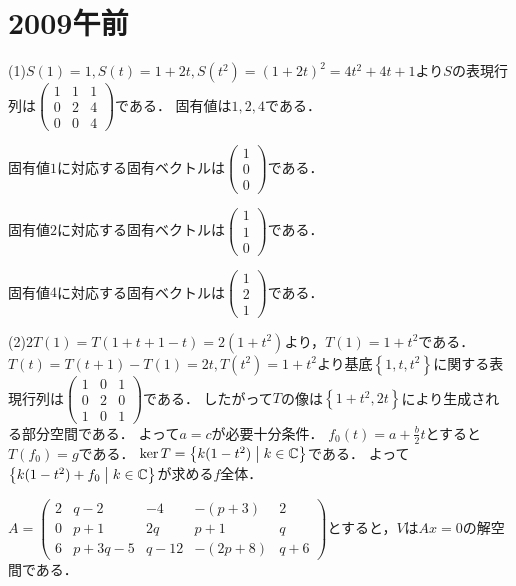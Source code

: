 \documentclass[
		book,
		head_space=20mm,
		foot_space=20mm,
		gutter=10mm,
		line_length=190mm
]{jlreq}
\begin{document}
\section{2009午前}
(1)$S(1)=1,S(t)=1+2t,S(t^2)=(1+2t)^2=4t^2+4t+1$より$S$の表現行列は$\begin{pmatrix}
1&1&1\\
0&2&4\\
0&0&4
\end{pmatrix}$である．
固有値は$1,2,4$である．

固有値$1$に対応する固有ベクトルは$\begin{pmatrix}
1\\0\\0
\end{pmatrix}$である．

固有値$2$に対応する固有ベクトルは$\begin{pmatrix}
1\\1\\0
\end{pmatrix}$である．

固有値$4$に対応する固有ベクトルは$\begin{pmatrix}
1\\2\\1
\end{pmatrix}$である．

(2)$2T(1)=T(1+t+1-t)=2(1+t^2)$より，$T(1)=1+t^2$である．$T(t)=T(t+1)-T(1)=2t,T(t^2)=1+t^2$より基底$\left\{ 1,t,t^2 \right\}$に関する表現行列は$\begin{pmatrix}
1&0&1\\
0&2&0\\
1&0&1
\end{pmatrix}$である．
したがって$T$の像は$\left\{ 1+t^2,2t \right\}$により生成される部分空間である．
よって$a=c$が必要十分条件．
$f_0(t)= a+\frac{b}{2} t$とすると$T(f_0)=g$である．
$\ker T= \left\{ k(1-t^2)\mathrel{}\middle|\mathrel{} k\in \mathbb{C}\right\}$である．
よって$\left\{ k(1-t^2)+f_0 \mathrel{}\middle|\mathrel{}k\in \mathbb{C} \right\}$が求める$f$全体．

$A= \begin{pmatrix}
2&q-2&-4&-(p+3)&2\\
0&p+1&2q&p+1&q\\
6&p+3q-5&q-12&-(2p+8)&q+6
\end{pmatrix} $とすると，$V$は$Ax=0$の解空間である．
\end{document}
